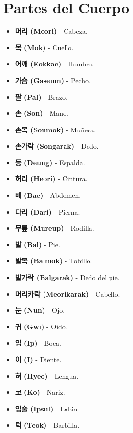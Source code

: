 \section{Partes del Cuerpo}

\begin{itemize}
	\item \textbf{머리 (Meori)} - Cabeza.
	\item \textbf{목 (Mok)} - Cuello.
	\item \textbf{어깨 (Eokkae)} - Hombro.
	\item \textbf{가슴 (Gaseum)} - Pecho.
	\item \textbf{팔 (Pal)} - Brazo.
	\item \textbf{손 (Son)} - Mano.
	\item \textbf{손목 (Sonmok)} - Muñeca.
	\item \textbf{손가락 (Songarak)} - Dedo.
	\item \textbf{등 (Deung)} - Espalda.
	\item \textbf{허리 (Heori)} - Cintura.
	\item \textbf{배 (Bae)} - Abdomen.
	\item \textbf{다리 (Dari)} - Pierna.
	\item \textbf{무릎 (Mureup)} - Rodilla.
	\item \textbf{발 (Bal)} - Pie.
	\item \textbf{발목 (Balmok)} - Tobillo.
	\item \textbf{발가락 (Balgarak)} - Dedo del pie.
	\item \textbf{머리카락 (Meorikarak)} - Cabello.
	\item \textbf{눈 (Nun)} - Ojo.
	\item \textbf{귀 (Gwi)} - Oído.
	\item \textbf{입 (Ip)} - Boca.
	\item \textbf{이 (I)} - Diente.
	\item \textbf{혀 (Hyeo)} - Lengua.
	\item \textbf{코 (Ko)} - Nariz.
	\item \textbf{입술 (Ipsul)} - Labio.
	\item \textbf{턱 (Teok)} - Barbilla.
\end{itemize}